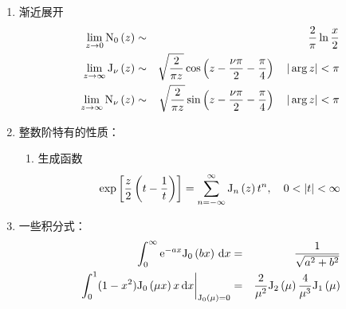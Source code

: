 \documentclass[12pt,a4paper]{article}
\newcommand\diff{\,\mathrm{d}}
\renewcommand{\[}{\ $\displaystyle}
\renewcommand{\]}{$\ }%
\newcommand\mi{\mathrm{i}}
\newcommand\e{\mathrm{e}}
\newcommand{\summ}[2][n]{\sum_{#1=#2}^\infty}
\begin{document}
\begin{enumerate}
	     \item 渐近展开
	     	\begin{eqnarray*}
	     	 \lim_{z\to 0}\fn[0]{z} &\sim & \frac{2}{\pi}\ln \frac x2\\
	     	 \lim_{z\to\infty}\fj{z} &\sim & \sqrt{\frac 2{\pi z}}\cos\left(z-\frac{\nu\pi}2 - \frac \pi 4\right)\quad |\arg z|<\pi \\
	     	 \lim_{z\to\infty}\fn{z} &\sim & \sqrt{\frac 2{\pi z}}\sin\left(z-\frac{\nu\pi}2 - \frac \pi 4\right)\quad |\arg z|<\pi
	     	\end{eqnarray*}
	     \item 整数阶特有的性质：
	     	\begin{enumerate}
	     	 \item 生成函数
	     	 	$$
	     	 	  \exp\left[\frac z2\left(t - \frac 1t\right)\right] = \summ{-\infty} \fj[n]{z}t^n, \quad 0<|t|<\infty
	     	 	$$
	     	\end{enumerate}
	     \item 一些积分式：
	     	\begin{eqnarray*}
	     	 \int_0^\infty \e^{-ax}\fj[0]{bx} \diff x &=& \frac{1}{\sqrt{a^2+b^2}} \\
	     	 \left.\int_0^1(1-x^2)\fj[0]{\mu x}x\diff x\right|_{\fj[0]{\mu} = 0} &=& \frac{2}{\mu^2}\fj[2]{\mu} \frac{4}{\mu^3}\fj[1]{\mu}
	     	\end{eqnarray*}

\end{enumerate}
\end{document}
